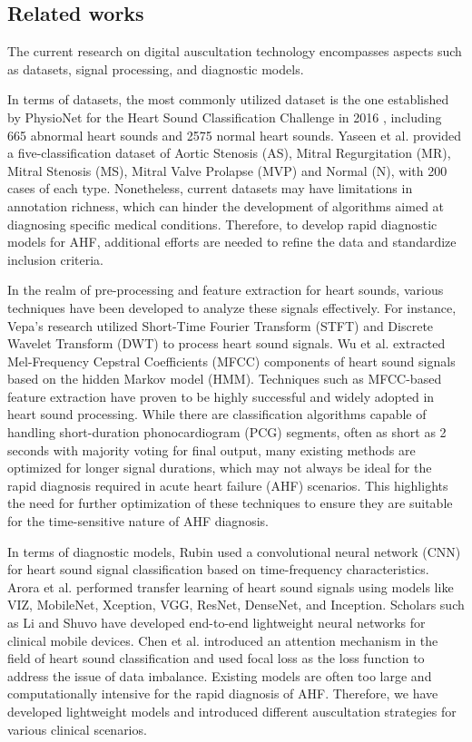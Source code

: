 \subsection{Related works}
The current research on digital auscultation technology encompasses aspects such as datasets, signal processing, and diagnostic models.

In terms of datasets, the most commonly utilized dataset is the one established by PhysioNet for the Heart Sound Classification Challenge in 2016 \cite{clifford2016classification}, including 665 abnormal heart sounds and 2575 normal heart sounds. Yaseen et al. \cite{son2018classification} provided a five-classification dataset of Aortic Stenosis (AS), Mitral Regurgitation (MR), Mitral Stenosis (MS), Mitral Valve Prolapse (MVP) and Normal (N), with 200 cases of each type. Nonetheless, current datasets may have limitations in annotation richness, which can hinder the development of algorithms aimed at diagnosing specific medical conditions. Therefore, to develop rapid diagnostic models for AHF, additional efforts are needed to refine the data and standardize inclusion criteria.

In the realm of pre-processing and feature extraction for heart sounds, various techniques have been developed to analyze these signals effectively. For instance, Vepa's research \cite{vepa2009classification} utilized Short-Time Fourier Transform (STFT) and Discrete Wavelet Transform (DWT) to process heart sound signals. Wu et al. \cite{wu2010hidden} extracted Mel-Frequency Cepstral Coefficients (MFCC) components of heart sound signals based on the hidden Markov model (HMM). Techniques such as MFCC-based feature extraction have proven to be highly successful and widely adopted in heart sound processing. While there are classification algorithms capable of handling short-duration phonocardiogram (PCG) segments, often as short as 2 seconds with majority voting for final output, many existing methods are optimized for longer signal durations, which may not always be ideal for the rapid diagnosis required in acute heart failure (AHF) scenarios. This highlights the need for further optimization of these techniques to ensure they are suitable for the time-sensitive nature of AHF diagnosis.

In terms of diagnostic models, Rubin \cite{rubin2016classifying} used a convolutional neural network (CNN) for heart sound signal classification based on time-frequency characteristics. Arora et al. \cite{arora2021transfer,xiang2023research} performed transfer learning of heart sound signals using models like VIZ, MobileNet, Xception, VGG, ResNet, DenseNet, and Inception. Scholars such as Li and Shuvo \cite{li2021lightweight,shuvo2021cardioxnet} have developed end-to-end lightweight neural networks for clinical mobile devices. Chen et al. \cite{chen2023robust} introduced an attention mechanism in the field of heart sound classification and used focal loss as the loss function to address the issue of data imbalance. Existing models are often too large and computationally intensive for the rapid diagnosis of AHF. Therefore, we have developed lightweight models and introduced different auscultation strategies for various clinical scenarios.


